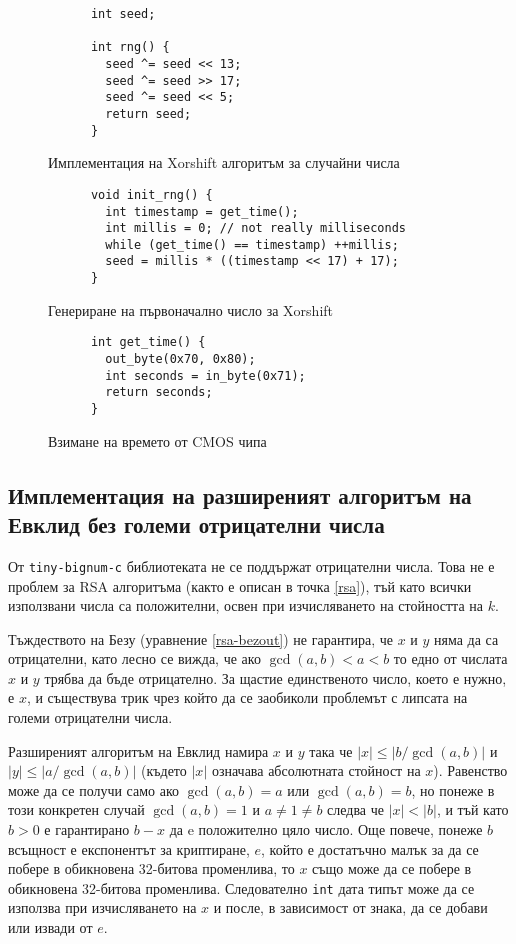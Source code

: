   \begin{figure}[ht]
    \centering
    \caption{Имплементация на Xorshift алгоритъм за случайни числа}
    \begin{verbatim}
      int seed;

      int rng() {
        seed ^= seed << 13;
        seed ^= seed >> 17;
        seed ^= seed << 5;
        return seed;
      }
    \end{verbatim}
    \label{fig:xorshift}
  \end{figure}

  \begin{figure}[ht]
    \centering
    \caption{Генериране на първоначално число за Xorshift}
    \begin{verbatim}
      void init_rng() {
        int timestamp = get_time();
        int millis = 0; // not really milliseconds
        while (get_time() == timestamp) ++millis;
        seed = millis * ((timestamp << 17) + 17);
      }
    \end{verbatim}
    \label{fig:seed-generation}
  \end{figure}

  \begin{figure}[ht]
    \centering
    \begin{verbatim}
      int get_time() {
        out_byte(0x70, 0x80);
        int seconds = in_byte(0x71);
        return seconds;
      }
    \end{verbatim}
    \caption{Взимане на времето от CMOS чипа}
    \label{fig:cmos-time}
  \end{figure}

  \subsection{Имплементация на разширеният алгоритъм на Евклид без големи отрицателни числа}
  От {\tt tiny-bignum-c} библиотеката не се поддържат отрицателни числа. Това не е проблем за RSA алгоритъма (както е описан в точка \ref{rsa}), тъй като всички използвани числа са положителни, освен при изчисляването на стойността на $k$.

  Тъждеството на Безу (уравнение \ref{rsa-bezout}) не гарантира, че $x$ и $y$ няма да са отрицателни, като лесно се вижда, че ако $\gcd(a,b) < a < b$ то едно от числата $x$ и $y$ трябва да бъде отрицателно. За щастие единственото число, което е нужно, е $x$, и съществува трик чрез който да се заобиколи проблемът с липсата на големи отрицателни числа.

  Разширеният алгоритъм на Евклид намира $x$ и $y$ така че $|x|\leq|b/\gcd(a,b)|$ и $|y|\leq|a/\gcd(a,b)|$ (където $|x|$ означава абсолютната стойност на $x$). Равенство може да се получи само ако $\gcd(a,b)=a$ или $\gcd(a,b)=b$, но понеже в този конкретен случай $\gcd(a,b)=1$ и $a \neq 1 \neq b$ следва че $|x|<|b|$, и тъй като $b>0$ е гарантирано $b-x$ да e положително цяло число.
  Още повече, понеже $b$ всъщност е експонентът за криптиране, $e$, който е достатъчно малък за да се побере в обикновена 32-битова променлива, то $x$ също може да се побере в обикновена 32-битова променлива. Следователно {\tt int} дата типът може да се използва при изчисляването на $x$ и после, в зависимост от знака, да се добави или извади от $e$.

